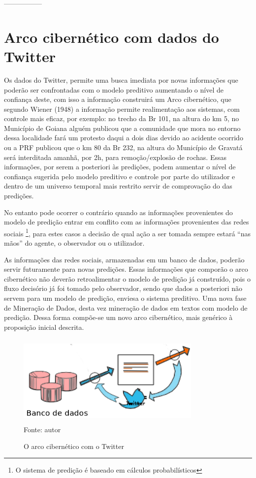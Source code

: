 -----------------

\pagebreak

\section{Arco cibernético com dados do Twitter}

Os dados do Twitter, permite uma busca imediata por novas informações que poderão ser confrontadas com o 
modelo preditivo aumentando o nível de confiança deste, com isso a informação construirá um Arco cibernético, que segundo Wiener (1948) a 
informação permite realimentação aos sistemas, com controle mais eficaz, por exemplo: no trecho da Br 101, na altura do km 5, no 
Município de Goiana alguém publicou que a comunidade que mora no entorno dessa localidade fará um protesto daqui a dois dias devido ao 
acidente ocorrido ou a PRF publicou que o km 80 da Br 232, na altura do Município de Gravatá será interditada amanhã, por 2h, para 
remoção/explosão de rochas. 
Essas informações, por serem a posteriori às predições, podem aumentar o nível de confiança sugerida pelo modelo preditivo e controle por 
parte do utilizador e dentro de um universo temporal mais restrito servir de comprovação do das predições.

No entanto pode ocorrer o contrário quando as informações provenientes do modelo de predição entrar em conflito com as informações 
provenientes das redes sociais \footnote{O sistema de predição é baseado em cálculos probabilísticos}, para estes casos a decisão de 
qual ação a ser tomada sempre estará ``nas mãos'' do agente, o observador ou o utilizador.

As informações das redes sociais, armazenadas em um banco de dados, poderão servir futuramente para novas predições.
Essas informações que comporão o arco cibernético não deverão retroalimentar o modelo de predição já construído, pois o fluxo decisório
já foi tomado pelo observador, sendo que dados a posteriori não servem para um modelo de predição, enviesa o sistema preditivo.
Uma nova fase de Mineração de Dados, desta vez mineração de dados em textos com modelo de predição. 
Dessa forma compõe-se um novo arco cibernético, mais genérico à proposição inicial descrita.

\begin{figure}[ht]
\centering
\caption{O arco cibernético com o Twitter}
\includegraphics[width=90mm, height=45mm]{Figuras/Metodologia/ArcoCibernetico.png}\\
\tiny Fonte: autor
\end{figure}

